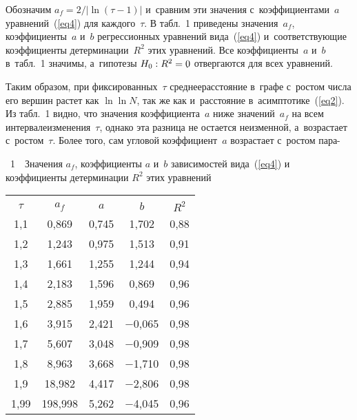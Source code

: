 \begin{multicols}{2}
Обозначим $a_f={2}/{|\ln(\tau-1)|}$ и~сравним эти значения с~коэффициентами~$a$ уравнений~(\ref{eq4})
для каждого~$\tau$.
В табл.~1 приведены значения~$a_f$, коэффициенты~$a$ и~$b$ регрессионных урав\-не\-ний вида~(\ref{eq4})
и~соответствующие коэффициенты детерминации~$R^2$ этих уравнений. Все коэффициенты~$a$ и~$b$ в~табл.~1
значимы, а~гипотезы $H_0: R^2\hm=0$ отвергаются для всех уравнений.




Таким образом, при фиксированных~$\tau$ сред\-нее\linebreak рас\-сто\-яние в~графе с~рос\-том чис\-ла его вершин\linebreak
рас\-тет как $\ln\ln N$, так же как и~расстояние в~асимп\-то\-ти\-ке~(\ref{eq2}). Из табл.~1 видно,
что значения коэффициента~$a$ ниже значений~$a_f$ на всем
интервале\linebreak  изменения~$\tau$, однако эта разница не остается неизменной,
а~возрастает с~рос\-том~$\tau$.
Более того, сам угловой коэффициент~$a$ возрастает с~рос\-том
па\-ра-\linebreak\vspace*{-12pt}

\begin{center}

\vspace*{6pt}

\noindent
\parbox{64mm}{{{\tablename~1}\ \ \small{Значения $a_f$, коэффициенты $a$ и~$b$ зависимостей вида~(\ref{eq4})
и коэффициенты детерминации $R^2$ этих уравнений
}}}


\vspace*{6pt}


{\small 
\begin{tabular}{|c|c|c|c|c|}
\hline
&&&&\\[-10pt]
$\tau$ & $a_f$ & $a$ & $b$ & $R^2$ \\ 
\hline
1,1 & 0,869 &   0,745 & \hphantom{$-$}1,702 & 0,88 \\
1,2 & 1,243 &   0,975 & \hphantom{$-$}1,513 & 0,91 \\
1,3 & 1,661 &   1,255 & \hphantom{$-$}1,244 & 0,94 \\
1,4 & 2,183 &   1,596 & \hphantom{$-$}0,869 & 0,96 \\
1,5 & 2,885 &   1,959 & \hphantom{$-$}0,494 & 0,96 \\
1,6 & 3,915 &   2,421 & $-$0,065 & 0,98 \\
1,7 & 5,607 &   3,048 & $-$0,909 & 0,98 \\
1,8 & 8,963 &   3,668 & $-$1,710 & 0,98 \\
1,9 & 18,982\hphantom{9} & 4,417 & $-$2,806 & 0,98 \\
\hphantom{9}1,99 & 198,998\hphantom{99} & 5,262 & $-$4,045 & 0,96\\
\hline
\end{tabular}
}
\end{center}


\end{multicols}
